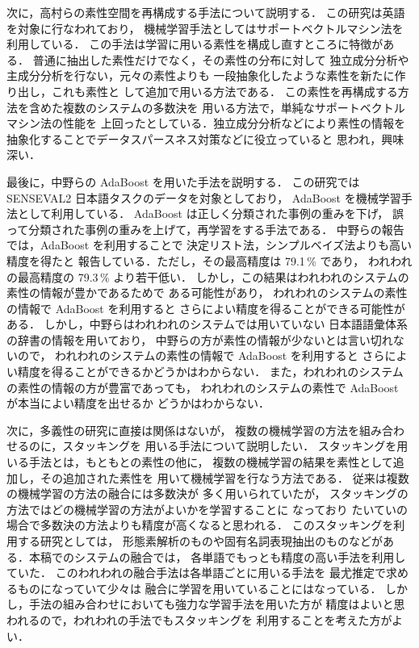 次に，高村らの素性空間を再構成する手法\cite{takamura2001_NL}について説明する．
この研究は英語を対象に行なわれており，
機械学習手法としてはサポートベクトルマシン法を利用している．
この手法は学習に用いる素性を構成し直すところに特徴がある．
普通に抽出した素性だけでなく，その素性の分布に対して
独立成分分析や主成分分析を行ない，元々の素性よりも
一段抽象化したような素性を新たに作り出し，これも素性と
して追加で用いる方法である．
この素性を再構成する方法を含めた複数のシステムの多数決を
用いる方法で，単純なサポートベクトルマシン法の性能を
上回ったとしている．独立成分分析などにより素性の情報を
抽象化することでデータスパースネス対策などに役立っていると
思われ，興味深い．

最後に，中野らの AdaBoost を用いた手法\cite{nakano_ada}を説明する．
この研究では SENSEVAL2 日本語タスクのデータを対象としており，
AdaBoost を機械学習手法として利用している．
AdaBoost は正しく分類された事例の重みを下げ，
誤って分類された事例の重みを上げて，再学習をする手法である．
中野らの報告では，AdaBoost を利用することで
決定リスト法，シンプルベイズ法よりも高い精度を得たと
報告している．ただし，その最高精度は 79.1\,\% であり，
われわれの最高精度の 79.3\,\% より若干低い．
しかし，この結果はわれわれのシステムの素性の情報が豊かであるためで
ある可能性があり，
われわれのシステムの素性の情報で AdaBoost を利用すると
さらによい精度を得ることができる可能性がある．
しかし，中野らはわれわれのシステムでは用いていない
日本語語彙体系\cite{ntt}の辞書の情報を用いており，
中野らの方が素性の情報が少ないとは言い切れないので，
われわれのシステムの素性の情報で AdaBoost を利用すると
さらによい精度を得ることができるかどうかはわからない．
また，われわれのシステムの素性の情報の方が豊富であっても，
われわれのシステムの素性で AdaBoost が本当によい精度を出せるか
どうかはわからない．

次に，多義性の研究に直接は関係はないが，
複数の機械学習の方法を組み合わせるのに，スタッキングを
用いる手法\cite{Halteren_cl2001}について説明したい．
スタッキングを用いる手法とは，もともとの素性の他に，
複数の機械学習の結果を素性として追加し，その追加された素性を
用いて機械学習を行なう方法である．
従来は複数の機械学習の方法の融合には多数決が
多く用いられていたが，
スタッキングの方法ではどの機械学習の方法がよいかを学習することに
なっており
たいていの場合で多数決の方法よりも精度が高くなると思われる．
このスタッキングを利用する研究としては，
形態素解析のもの\cite{Halteren_cl2001}や固有名詞表現抽出のもの\cite{Utsuro_ne}などがある．本稿でのシステムの融合では，
各単語でもっとも精度の高い手法を利用していた．
このわれわれの融合手法は各単語ごとに用いる手法を
最尤推定で求めるものになっていて少々は
融合に学習を用いていることにはなっている．
しかし，手法の組み合わせにおいても強力な学習手法を用いた方が
精度はよいと思われるので，われわれの手法でもスタッキングを
利用することを考えた方がよい．

